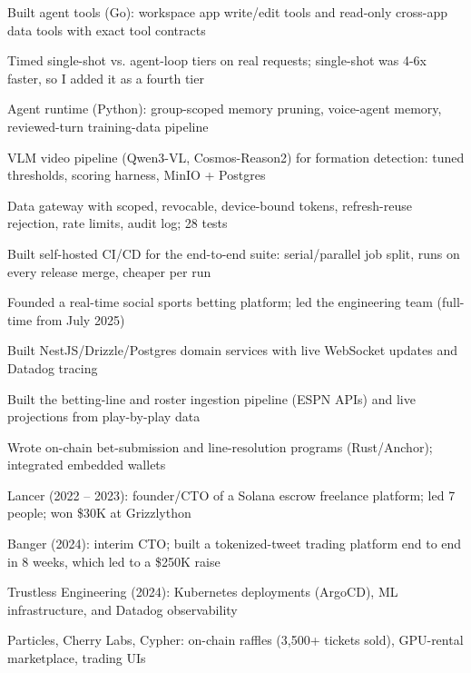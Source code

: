 \documentclass[print]{jack-resume}
\begin{document}
\begin{tightemize}
    \item Built agent tools (Go): workspace app write/edit tools and read-only cross-app data tools with exact tool contracts
    \item Timed single-shot vs. agent-loop tiers on real requests; single-shot was 4-6x faster, so I added it as a fourth tier
    \item Agent runtime (Python): group-scoped memory pruning, voice-agent memory, reviewed-turn training-data pipeline
    \item VLM video pipeline (Qwen3-VL, Cosmos-Reason2) for formation detection: tuned thresholds, scoring harness, MinIO + Postgres
    \item Data gateway with scoped, revocable, device-bound tokens, refresh-reuse rejection, rate limits, audit log; 28 tests
    \item Built self-hosted CI/CD for the end-to-end suite: serial/parallel job split, runs on every release merge, cheaper per run
\end{tightemize}
\sectionsep

\begin{tightemize}
    \item Founded a real-time social sports betting platform; led the engineering team (full-time from July 2025)
    \item Built NestJS/Drizzle/Postgres domain services with live WebSocket updates and Datadog tracing
    \item Built the betting-line and roster ingestion pipeline (ESPN APIs) and live projections from play-by-play data
    \item Wrote on-chain bet-submission and line-resolution programs (Rust/Anchor); integrated embedded wallets
\end{tightemize}
\sectionsep

\begin{tightemize}
    \item Lancer (2022 – 2023): founder/CTO of a Solana escrow freelance platform; led 7 people; won \$30K at Grizzlython
    \item Banger (2024): interim CTO; built a tokenized-tweet trading platform end to end in 8 weeks, which led to a \$250K raise
    \item Trustless Engineering (2024): Kubernetes deployments (ArgoCD), ML infrastructure, and Datadog observability
    \item Particles, Cherry Labs, Cypher: on-chain raffles (3,500+ tickets sold), GPU-rental marketplace, trading UIs
\end{tightemize}
\sectionsep
\end{document}
